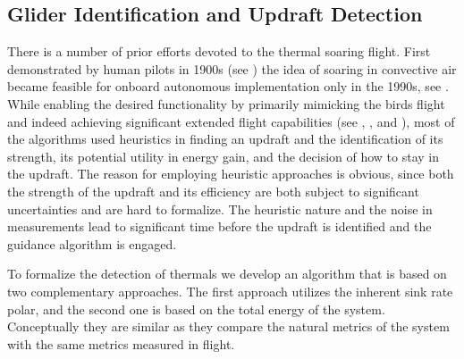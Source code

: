 \documentclass{ifacconf}
\newcommand{\squeezeup}{\vspace{-3.0mm}}
\begin{document}
\subsection{Glider Identification and Updraft Detection}
\label{subsec:SysID}
\squeezeup
There is a number of prior efforts devoted to the thermal soaring flight.
First demonstrated by human pilots in 1900s (see \cite{Simons:1998}) the idea
of soaring in convective air became feasible for onboard autonomous
implementation only in the 1990s, see \cite{Wharington:1998}. While enabling
the desired functionality by primarily mimicking the birds flight and indeed
achieving significant extended flight capabilities (see \cite{Edwards:2008},
\cite{Allen:2006}, and \cite{Allen:2007}), most of the algorithms used
heuristics in finding an updraft and the identification of its strength, its
potential utility in energy gain, and the decision of how to stay in the
updraft. The reason for employing heuristic approaches is obvious, since both
the strength of the updraft and its efficiency are both subject to
significant uncertainties and are hard to formalize.
The heuristic nature and the noise in measurements lead to significant time before the updraft  is identified and the guidance algorithm is engaged.

%
%

To formalize the detection of thermals we develop an algorithm that is based on two complementary approaches. The first approach utilizes the inherent sink rate polar, and the
second one is based on the total energy of the system. Conceptually
they are similar as they compare the natural metrics of the system with the
same metrics measured in flight.
\end{document}
